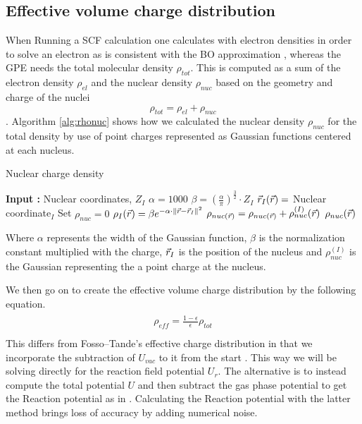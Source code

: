 \documentclass[..Thesis.tex]{subfiles}
\begin{document}
\subsection{Effective volume charge distribution}
When Running a \ac{SCF} calculation one calculates with electron densities in order
to solve an electron \SE as is consistent with the \ac{BO} approximation
\cite{Cramer:2004, Konishi:2009}, whereas the \ac{GPE} needs the total molecular
density $\rho_{tot}$. This is computed as a sum of the electron
density $\rho_{el}$ and the nuclear density $\rho_{nuc}$ based on the
geometry and charge of the nuclei
\begin{equation}
  \rho_{tot} = \rho_{el} + \rho_{nuc}
\end{equation}.
Algorithm \ref{alg:rhonuc} shows how we calculated the nuclear
density $\rho_{nuc}$ for the total density by use of point charges represented as
Gaussian functions centered at each nucleus.
\begin{algorithm}
  \caption{Nuclear charge density}\label{alg:rhonuc}
  \begin{algorithmic}
    \STATE \textbf{Input :} Nuclear coordinates, $Z_I$
    \STATE $\alpha = 1000$
    \STATE $\beta = (\frac{\alpha}{\pi})^{\frac{3}{2}} \cdot Z_I$
    \STATE $\vec{r}_I(\vec{r}) =$ Nuclear coordinate$_I$
    \STATE Set $\rho_{nuc} = 0$
    \STATE $\rho_{I}(\vec{r}) = \beta e^{-\alpha\cdot\lVert\vec{r} -\vec{r}_I\rVert^2}$
    \STATE $\rho_{nuc(\vec{r})} = \rho_{nuc(\vec{r})} + \rho_{nuc}^{(I)}(\vec{r})$
    \ENDFOR
    \RETURN $\rho_{nuc}(\vec{r})$
  \end{algorithmic}
\end{algorithm}

Where $\alpha$ represents the width of the Gaussian function, $\beta$ is the normalization
constant multiplied with the charge, $\vec{r}_I$ is the position of the nucleus and
$\rho_{nuc}^{(I)}$ is the Gaussian representing the a point charge at the nucleus.

We then go on to create the effective volume charge distribution by the following equation.
\begin{align}
    \begin{split}
      \rho_{eff} = \frac{1 - \epsilon}{\epsilon}\rho_{tot}\\
    \end{split}
\end{align}
This differs from Fosso--Tande's effective charge distribution in that we incorporate
the subtraction of $U_{vac}$ to it from the start \cite{FossoTande:2013ka}. This
way we will be solving directly for the reaction field potential $U_r$.
The alternative is to instead compute the total potential $U$ and then subtract
the gas phase potential to get the Reaction potential as in \cite{FossoTande:2013ka}.
Calculating the Reaction potential with the latter method brings loss of accuracy
by adding numerical noise.
\end{document}
